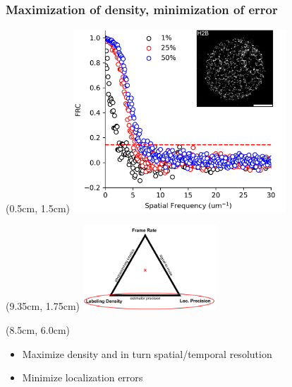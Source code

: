 \documentclass{beamer}					%
\begin{document}
\begin{frame}
\frametitle{Maximization of density, minimization of error}

\begin{textblock*}{8cm}(0.5cm, 1.5cm)
\includegraphics[width=8cm]{../../dissertation/dissertation/media/FRC.png}
\end{textblock*}

\begin{textblock*}{5cm}(9.35cm, 1.75cm)
\includegraphics[width=5cm]{../../dissertation/dissertation/media/Tradeoff2.png}
\end{textblock*}


\begin{textblock*}{6cm}(8.5cm, 6.0cm)
\begin{itemize}
\item Maximize density and in turn spatial/temporal resolution
\item Minimize localization errors 
\end{itemize}
\end{textblock*}

\end{frame}

\end{document}

